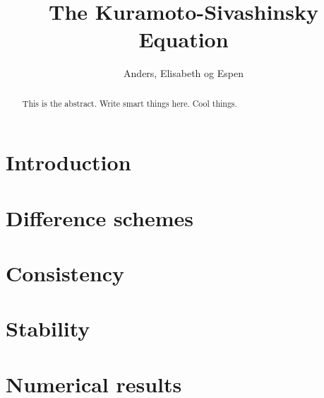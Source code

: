 \documentclass[10pt,a4paper]{article}
\begin{document}
\title{The Kuramoto-Sivashinsky Equation}
\author{Anders, Elisabeth og Espen}
\maketitle

\begin{abstract}
This is the abstract. Write smart things here. Cool things.
\end{abstract}



\section{Introduction}


\section{Difference schemes}


\section{Consistency}


\section{Stability}


\section{Numerical results}

\end{document}
